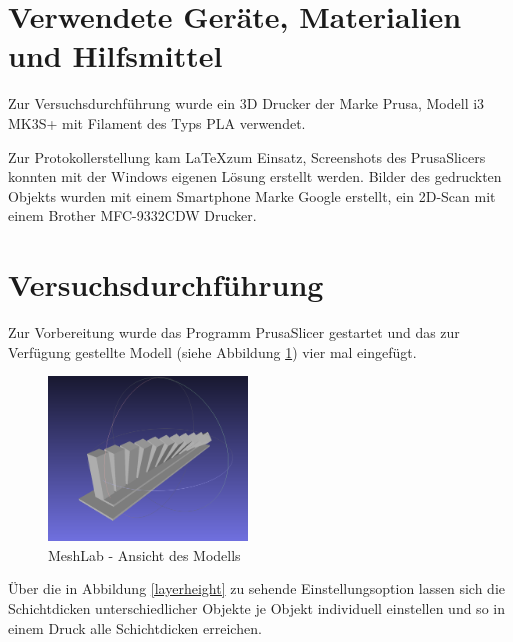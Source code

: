 \documentclass[a4paper,12pt,bibtotocnumbered]{scrartcl}
\numberwithin{equation}{section} %
\begin{document}
\section[Verwendete Geräte, Materialien und Hilfsmittel]{Verwendete Geräte, Materialien und Hilfsmittel}

Zur Versuchsdurchführung wurde ein 3D Drucker der Marke Prusa, Modell i3 MK3S+ mit Filament des Typs PLA verwendet. 

Zur Protokollerstellung kam \LaTeX\;zum Einsatz, Screenshots des PrusaSlicers konnten mit der Windows eigenen Lösung erstellt werden. Bilder des gedruckten Objekts wurden mit einem Smartphone Marke Google erstellt, ein 2D-Scan mit einem Brother MFC-9332CDW Drucker.

\newpage

\section[Versuchsdurchführung]{Versuchsdurchführung}

Zur Vorbereitung wurde das Programm PrusaSlicer gestartet und das zur Verfügung gestellte Modell (siehe Abbildung \ref*{model}) vier mal eingefügt. 


\begin{figure}[H]
\centerline{\includegraphics[width=200px]{./images/model.png}}
\caption{MeshLab - Ansicht des Modells}
\label{model}
\end{figure}

Über die in Abbildung \ref*{layerheight} zu sehende Einstellungsoption lassen sich die Schichtdicken unterschiedlicher Objekte je Objekt individuell einstellen und so in einem Druck alle Schichtdicken erreichen.
\end{document}
